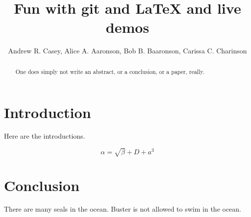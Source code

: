 \documentclass{article}
\begin{document}
\title{Fun with git and \LaTeX{} and live demos}
\author{Andrew R. Casey, Alice A. Aaronson, Bob B. Baaronson, Carissa C. Charinson}

\maketitle

\begin{abstract}
One does simply not write an abstract, or a conclusion, or a paper, really.
\end{abstract}

\section{Introduction}
Here are the introductions.

\begin{equation}
    \label{simple_equation}
    \alpha = \sqrt{ \beta } + D + a^3
\end{equation}


\section{Conclusion}
There are many seals in the ocean. Buster is not allowed to swim in the ocean.
\end{document}
